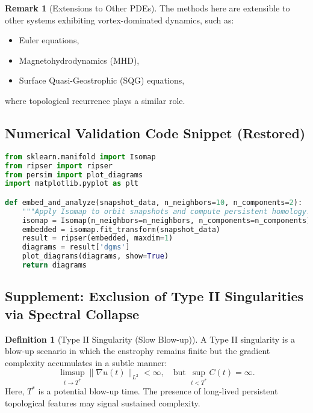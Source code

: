 \documentclass[11pt]{article}
\theoremstyle{definition}
\newtheorem{definition}[theorem]{Definition}
\newtheorem{remark}[theorem]{Remark}
\begin{document}
\begin{remark}[Extensions to Other PDEs]
The methods here are extensible to other systems exhibiting vortex-dominated dynamics, such as:
\begin{itemize}
  \item Euler equations,
  \item Magnetohydrodynamics (MHD),
  \item Surface Quasi-Geostrophic (SQG) equations,
\end{itemize}
where topological recurrence plays a similar role.
\end{remark}

\subsection*{Numerical Validation Code Snippet (Restored)}

\begin{lstlisting}[language=Python, caption=Isomap + Persistent Homology Validation for Navier--Stokes Orbit Geometry]
from sklearn.manifold import Isomap
from ripser import ripser
from persim import plot_diagrams
import matplotlib.pyplot as plt

def embed_and_analyze(snapshot_data, n_neighbors=10, n_components=2):
    """Apply Isomap to orbit snapshots and compute persistent homology."""
    isomap = Isomap(n_neighbors=n_neighbors, n_components=n_components)
    embedded = isomap.fit_transform(snapshot_data)
    result = ripser(embedded, maxdim=1)
    diagrams = result['dgms']
    plot_diagrams(diagrams, show=True)
    return diagrams
\end{lstlisting}


\subsection*{Supplement: Exclusion of Type II Singularities via Spectral Collapse}

\begin{definition}[Type II Singularity (Slow Blow-up)]
A Type II singularity is a blow-up scenario in which the enstrophy remains finite but the gradient complexity accumulates in a subtle manner:
\[
\limsup_{t \to T^*} \|\nabla u(t)\|_{L^2} < \infty, \quad \text{but } \sup_{t<T^*} C(t) = \infty.
\]
Here, $T^*$ is a potential blow-up time. The presence of long-lived persistent topological features may signal sustained complexity.
\end{definition}
\end{document}
